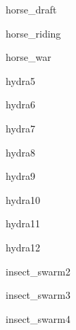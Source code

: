 \documentclass[letterpaper,serif]{module}
\begin{document}
\begin{newmonster}{horse_draft}\end{newmonster}

\begin{newmonster}{horse_riding}\end{newmonster}

\begin{newmonster}{horse_war}\end{newmonster}

\begin{newmonster}{hydra5}\end{newmonster}

\begin{newmonster}{hydra6}\end{newmonster}

\begin{newmonster}{hydra7}\end{newmonster}

\begin{newmonster}{hydra8}\end{newmonster}

\begin{newmonster}{hydra9}\end{newmonster}

\begin{newmonster}{hydra10}\end{newmonster}

\begin{newmonster}{hydra11}\end{newmonster}

\begin{newmonster}{hydra12}\end{newmonster}

\begin{newmonster}{insect_swarm2}\end{newmonster}

\begin{newmonster}{insect_swarm3}\end{newmonster}

\begin{newmonster}{insect_swarm4}\end{newmonster}
\end{document}
